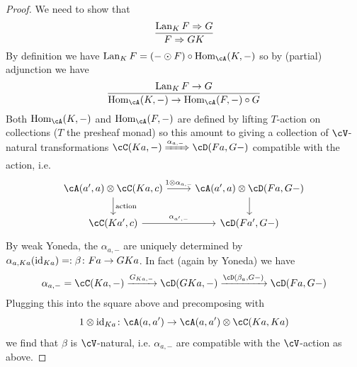 \documentclass[a4paper,11pt,oneside,openany]{scrbook}
\begin{document}
\begin{proof}
    We need to show that
    \begin{displaymath}
	\frac{\operatorname{Lan}_K F \Rightarrow G}{F \Rightarrow GK}
    \end{displaymath}
    By definition we have $ \Lan_K F = (- \odot F) \circ \Hom_\cA(K,-) $ so by (partial) adjunction we have
    \begin{displaymath}
	\frac{\Lan_K F \to G}{\Hom_\cA(K,-) \to \Hom_\cA(F,-)\circ G}
    \end{displaymath}
    Both $ \Hom_\cA(K,-) $ and $ \Hom_\cA(F ,-) $ are defined by lifting $ T $-action on collections ($ T $ the presheaf monad) so this amount to giving a collection of $ \cV $-natural transformations
    $ \cC(Ka,-) \xRightarrow{\alpha_{a,-}} \cD(Fa,G-) $ compatible with the action, i.e.
    \begin{displaymath}
        \begin{tikzcd}
	    {\cA(a',a) \otimes \cC(Ka,c)}
	    \arrow[r, "1\otimes \alpha_{a,-}"]
	    \arrow[d,"\text{action}"] 
	    & {\cA(a',a)} \otimes \cD(Fa,G-) \arrow[d]\\
	    {\cC(Ka',c)} \arrow[r, "{\alpha_{a',-}}"] &{\cD(Fa',G-)}
        \end{tikzcd}
    \end{displaymath}
    By weak Yoneda, the $ \alpha_{a,-} $ are uniquely determined by $ \alpha_{a,Ka}(\operatorname{id}_{Ka}) =: \beta \colon Fa \to GKa $.
    In fact (again by Yoneda) we have
    \begin{displaymath}
	\alpha_{a,-} = \cC(Ka,-) \xrightarrow{G_{Ka,-}} \cD(GKa,-) \xrightarrow{\cD(\beta_a, G-)} \cD(Fa, G-)
    \end{displaymath}
    Plugging this into the square above and precomposing with
    \begin{displaymath}
	1\otimes \id_{Ka} \from \cA(a,a') \to \cA(a,a')\otimes \cC(Ka,Ka)
    \end{displaymath}
    we find that $ \beta $ is $ \cV $-natural, i.e. $ \alpha_{a,-} $ are compatible with the $ \cV $-action as above.
\end{proof}
\end{document}
